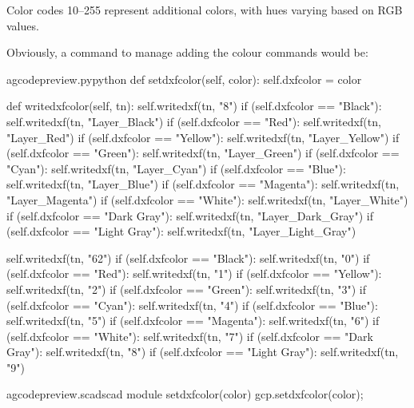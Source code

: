 \documentclass{ltxdoc}
\begin{document}
Color codes 10--255 represent additional colors, with hues varying based on RGB values.

Obviously, a command to manage adding the colour commands would be:

\lstset{firstnumber=\thegcpy}
\begin{writecode}{a}{gcodepreview.py}{python}
    def setdxfcolor(self, color):
        self.dxfcolor = color

    def writedxfcolor(self, tn):
            self.writedxf(tn, "8")
            if (self.dxfcolor == "Black"):
                self.writedxf(tn, "Layer_Black")
            if (self.dxfcolor == "Red"):
                self.writedxf(tn, "Layer_Red")
            if (self.dxfcolor == "Yellow"):
                self.writedxf(tn, "Layer_Yellow")
            if (self.dxfcolor == "Green"):
                self.writedxf(tn, "Layer_Green")
            if (self.dxfcolor == "Cyan"):
                self.writedxf(tn, "Layer_Cyan")
            if (self.dxfcolor == "Blue"):
                self.writedxf(tn, "Layer_Blue")
            if (self.dxfcolor == "Magenta"):
                self.writedxf(tn, "Layer_Magenta")
            if (self.dxfcolor == "White"):
                self.writedxf(tn, "Layer_White")
            if (self.dxfcolor == "Dark Gray"):
                self.writedxf(tn, "Layer_Dark_Gray")
            if (self.dxfcolor == "Light Gray"):
                self.writedxf(tn, "Layer_Light_Gray")

            self.writedxf(tn, "62")
            if (self.dxfcolor == "Black"):
                self.writedxf(tn, "0")
            if (self.dxfcolor == "Red"):
                self.writedxf(tn, "1")
            if (self.dxfcolor == "Yellow"):
                self.writedxf(tn, "2")
            if (self.dxfcolor == "Green"):
                self.writedxf(tn, "3")
            if (self.dxfcolor == "Cyan"):
                self.writedxf(tn, "4")
            if (self.dxfcolor == "Blue"):
                self.writedxf(tn, "5")
            if (self.dxfcolor == "Magenta"):
                self.writedxf(tn, "6")
            if (self.dxfcolor == "White"):
                self.writedxf(tn, "7")
            if (self.dxfcolor == "Dark Gray"):
                self.writedxf(tn, "8")
            if (self.dxfcolor == "Light Gray"):
                self.writedxf(tn, "9")

\end{writecode}
\addtocounter{gcpy}{48}

\lstset{firstnumber=\thegcpscad}
\begin{writecode}{a}{gcodepreview.scad}{scad}
module setdxfcolor(color){
    gcp.setdxfcolor(color);
}

\end{writecode}
\addtocounter{gcpscad}{4}
\end{document}
